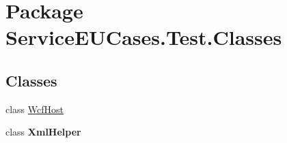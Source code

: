 \hypertarget{namespace_service_e_u_cases_1_1_test_1_1_classes}{\section{Package Service\-E\-U\-Cases.\-Test.\-Classes}
\label{namespace_service_e_u_cases_1_1_test_1_1_classes}
}
\subsection*{Classes}
\begin{DoxyCompactItemize}
\item 
class \hyperlink{class_service_e_u_cases_1_1_test_1_1_classes_1_1_wcf_host}{Wcf\-Host}
\item 
class {\bfseries Xml\-Helper}
\end{DoxyCompactItemize}
